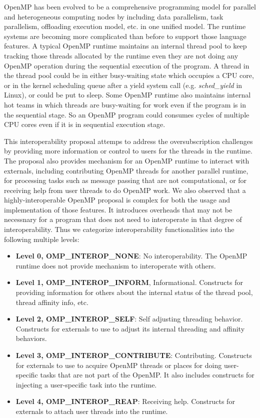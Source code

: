 OpenMP has been evolved to be a comprehensive programming model for parallel and heterogeneous computing nodes by including 
data parallelism, task parallelism, offloading execution model, etc. in one unified model. 
The runtime systems are becoming more complicated than before to support those language features.
A typical OpenMP runtime maintains an internal thread pool to keep tracking those threads allocated by the runtime even they are not  
doing any OpenMP operation during the sequential execution of the program. 
A thread in the thread pool could be in either busy-waiting state which occupies a CPU core, or in the kernel
scheduling queue after a yield system call (e.g. {\em sched\_yield} in Linux), or could be put to sleep. 
Some OpenMP runtime also maintains
internal hot teams in which threads are busy-waiting for work even if the program is in the sequential stage. 
So an OpenMP program could 
consumes cycles of multiple CPU cores even if it is in sequential execution stage.

This interoperability proposal attemps to address the oversubscription challenges by providing more information or control
to users for the threads in the runtime. The proposal also provides mechanism for an OpenMP runtime to interact with externals, including 
contributing OpenMP threads for another parallel runtime, for processing tasks such as message passing that are not computational, or for receiving
help from user threads to do OpenMP work. We also observed that a highly-interoperable OpenMP proposal is 
complex for both the usage and implementation of those features. It introduces
overheads that may not be necessnary for a program that does not need to interoperate in that degree of interoperability. 
Thus we
categorize interoperability functionalities into the following multiple levels: 
\begin{itemize}
	\item {\bf Level 0, OMP\_INTEROP\_NONE}: No interoperability. The OpenMP runtime does not provide mechanism to interoperate with others.
	\item {\bf Level 1, OMP\_INTEROP\_INFORM}, Informational. Constructs for providing information for others about the internal status of the thread pool, thread affinity info, etc. 
	\item {\bf Level 2, OMP\_INTEROP\_SELF}: Self adjusting threading behavior. Constructs for
		externals to use to adjust its internal threading and affinity behaviors.
	\item {\bf Level 3, OMP\_INTEROP\_CONTRIBUTE}: Contributing. Constructs for externals to use to acquire OpenMP 
		threads or places for doing user-specific tasks that are not part of the OpenMP. It also includes constructs for injecting
		a user-specific task into the runtime. 
	\item {\bf Level 4, OMP\_INTEROP\_REAP}: Receiving help. Constructs for externals to attach user threads into the runtime.
\end{itemize}

